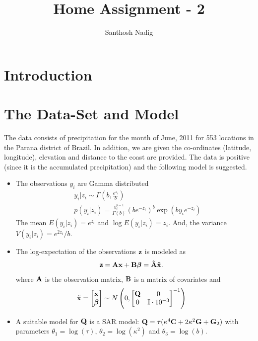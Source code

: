 \documentclass[a4paper,10pt]{article}
\title{Home Assignment - 2}
\author{Santhosh Nadig}
\def\bA{{\bf A}}
\def\bB{{\bf B}}
\def\bG{{\bf G}}
\def\bQ{{\bf Q}}
\def\bC{{\bf C}}
\def\btA{{\bf \tilde A}}
\def\bx{{\bf x}}
\def\bz{{\bf z}}
\def\btx{{\bf{\tilde x}}}
\def\bbeta{{\boldsymbol \beta}}
\begin{document}
\maketitle

\section{Introduction}


\section{The Data-Set and Model}
The data consists of precipitation for the month of June, 2011 for 553 locations in the Parana district of Brazil. In addition, we are given the co-ordinates (latitude, longitude), elevation and distance to the coast are provided. The data is positive (since it is the accumulated precipitation) and the following model is suggested.

\begin{itemize}
 \item The observations $y_i$ are Gamma distributed
 \begin{align*}
  & y_i|z_i \sim \Gamma \left( b , \frac{e^{z_i}}{b}\right) \\
  & p(y_i|z_i) = \frac{y_i^{b-1}}{\Gamma(b)} \left( b e^{-z_i} \right)^b \exp(b y_i e^{-z_i})
 \end{align*}
 The mean $E(y_i|z_i) = e^{z_i}$ and $\log E(y_i|z_i) = z_i$. And, the variance $V(y_i|z_i) = e^{2z_i}/b$.
 
 \item The log-expectation of the observations $\bz$ is modeled as 
 \begin{align*}
  & \bz = \bA \bx + \bB \bbeta = \btA \btx.
 \end{align*}
 where $\bA$ is the observation matrix, $\bB$ is a matrix of covariates and
 \begin{align*}
  &\btx = \begin{bmatrix}
          \bx \\
          \bbeta
         \end{bmatrix} \sim
         N\left( 0, \begin{bmatrix}
                     \bQ & 0 \\
                     0 & \mathbb{I} \cdot 10^{-3}
                    \end{bmatrix}^{-1}
 \right)
 \end{align*}
 \item A suitable model for $\bQ$ is a SAR model: $\bQ = \tau (\kappa^4 \bC + 2\kappa^2 \bG + \bG_2)$ with parameters $\theta_1 = \log (\tau)$,  $\theta_2 = \log (\kappa^2)$  and $\theta_3 = \log(b)$.
\end{itemize}
\end{document}
